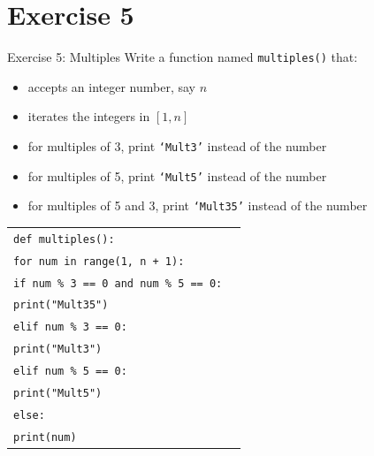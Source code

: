 \documentclass[t,handout,9pt]{beamer}
\begin{document}
\section{Exercise 5}
\begin{frame}{Exercise 5: Multiples}
\vfill
Write a function named \texttt{multiples()} that:
\begin{itemize}
	\item accepts an integer number, say $n$
	\item iterates the integers in $[1, n]$
	\item for multiples of 3, print \texttt{`Mult3'} instead of the number
	\item for multiples of 5, print \texttt{`Mult5'} instead of the number
	\item for multiples of 5 and 3, print \texttt{`Mult35'} instead of the number
\end{itemize}
\vfill
\end{frame}
%
\begin{frame}
	\vfill
		\begin{table}[]
		  \begin{flushleft}
		  \begin{tabular}{ll}
		  \texttt{def multiples():} &  \\
		  \texttt{\quad for num in range(1, n + 1):}        & \\
		  \texttt{\quad\quad if num \% 3 == 0 and num \% 5 == 0:}        & \\
		  \texttt{\quad\quad\quad print("Mult35")}        & \\
		  \texttt{\quad\quad elif num \% 3 == 0:}        & \\
		  \texttt{\quad\quad\quad print("Mult3")}        & \\
		  \texttt{\quad\quad elif num \% 5 == 0:}        & \\
		  \texttt{\quad\quad\quad print("Mult5")}        & \\
		  \texttt{\quad\quad else:}        & \\
		  \texttt{\quad\quad\quad print(num)}        & \\
		  \end{tabular}
		  \end{flushleft}
		\end{table}
	\vfill
\end{frame}
\end{document}
